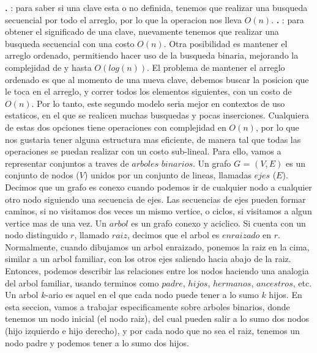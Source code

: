 \documentclass[10pt,a4paper]{article}
\begin{document}
\newline
\newline
\textbf{.} : para saber si una clave esta o no definida, tenemos que realizar una busqueda secuencial por todo el arreglo, por lo que la operacion nos lleva $O(n)$.
\newline
\newline
\textbf{.} : para obtener el significado de una clave, nuevamente tenemos que realizar una busqueda secuencial con una costo $O(n)$.
\newline
\newline
Otra posibilidad es mantener el arreglo ordenado, permitiendo hacer uso de la busqueda binaria, mejorando la complejidad de  y  hasta $O(log(n))$. El problema de mantener el arreglo ordenado es que al momento de  una nueva clave, debemos buscar la posicion que le toca en el arreglo, y correr todos los elementos siguientes, con un costo de $O(n)$. Por lo tanto, este segundo modelo seria mejor en contextos de uso estaticos, en el que se realicen muchas busquedas y pocas inserciones. Cualquiera de estas dos opciones tiene operaciones con complejidad en $O(n)$, por lo que nos gustaria tener alguna estructura mas eficiente, de manera tal que todas las operaciones se puedan realizar con un costo sub-lineal. Para ello, vamos a representar conjuntos a traves de $arboles$ $binarios$.
\newline
\newline
Un grafo $G$ = $(V,E)$ es un conjunto de nodos ($V$) unidos por un conjunto de lineas, llamadas $ejes$ ($E$). Decimos que un grafo es conexo cuando podemos ir de cualquier nodo a cualquier otro nodo siguiendo una secuencia de ejes. Las secuencias de ejes pueden formar caminos, si no visitamos dos veces un mismo vertice, o ciclos, si visitamos a algun vertice mas de una vez. Un $arbol$ es un grafo conexo y aciclico. Si cuenta con un nodo distinguido $r$, llamado $raiz$, decimos que el arbol es $enraizado$ en $r$. Normalmente, cuando dibujamos un arbol enraizado, ponemos la raiz en la cima, similar a un arbol familiar, con los otros ejes saliendo hacia abajo de la raiz. Entonces, podemos describir las relaciones
entre los nodos haciendo una analogia del arbol familiar, usando terminos como $padre$, $hijos$, $hermanos$, $ancestros$, etc.
\newline
\newline
Un arbol $k$-ario es aquel en el que cada nodo puede tener a lo sumo $k$ hijos. En esta seccion, vamos a trabajar especificamente sobre arboles binarios, donde tenemos un nodo inicial (el nodo raiz), del cual pueden salir a lo sumo dos nodos (hijo izquierdo e hijo derecho), y por cada nodo que no sea el raiz, tenemos un nodo padre y podemos tener a lo sumo dos hijos.
\end{document}
